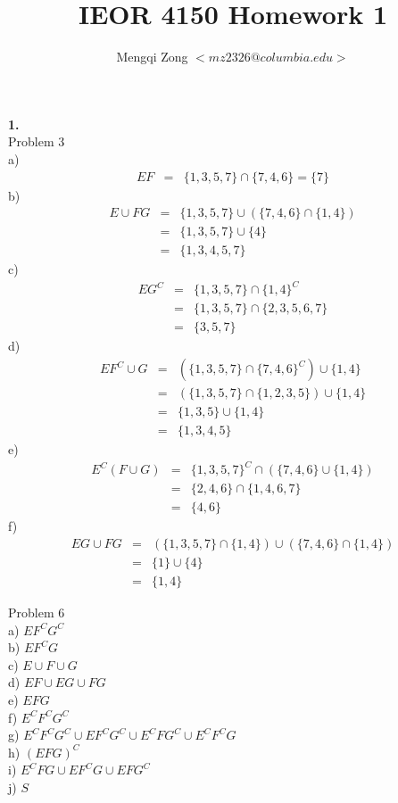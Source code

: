 \documentclass[12pt]{article}
\title{IEOR 4150 Homework 1}
\author{Mengqi Zong $<mz2326@columbia.edu>$}
\begin{document}
\maketitle

\setlength{\parindent}{0in}

{\bf 1.} \\

Problem 3 \\
a)
\begin{eqnarray*}
EF
&=& \{ 1,3,5,7 \} \cap \{ 7, 4, 6 \} = \{ 7 \}
\end{eqnarray*}
b)
\begin{eqnarray*}
E \cup FG
&=& \{ 1, 3, 5, 7 \} \cup (\{ 7, 4, 6 \} \cap \{ 1,4 \}) \\
&=& \{ 1, 3, 5, 7 \} \cup \{ 4 \} \\
&=& \{ 1, 3, 4, 5, 7 \}
\end{eqnarray*}
c)
\begin{eqnarray*}
EG^C
&=& \{ 1, 3, 5, 7 \} \cap \{ 1, 4 \}^C \\
&=& \{ 1, 3, 5, 7 \} \cap \{ 2, 3, 5, 6, 7 \} \\
&=& \{ 3, 5, 7 \}
\end{eqnarray*}
d)
\begin{eqnarray*}
EF^C \cup G
&=& (\{ 1, 3, 5, 7 \} \cap \{ 7, 4, 6\}^C) \cup \{ 1, 4 \} \\
&=& (\{ 1, 3, 5, 7 \} \cap \{ 1, 2, 3, 5 \}) \cup \{ 1, 4 \} \\
&=& \{ 1, 3, 5 \} \cup \{ 1, 4 \} \\
&=& \{ 1, 3, 4, 5 \}
\end{eqnarray*}
e)
\begin{eqnarray*}
E^C(F \cup G)
&=& \{ 1, 3, 5, 7 \}^C \cap (\{ 7, 4, 6 \} \cup \{ 1, 4 \}) \\
&=& \{ 2, 4, 6 \} \cap \{ 1, 4, 6, 7 \} \\
&=& \{ 4, 6 \}
\end{eqnarray*}
f)
\begin{eqnarray*}
EG \cup FG
&=& (\{ 1, 3, 5, 7\} \cap \{ 1, 4 \}) \cup (\{ 7, 4, 6\} \cap \{ 1, 4 \}) \\
&=& \{ 1 \} \cup \{ 4 \} \\
&=& \{ 1, 4\}
\end{eqnarray*}

Problem 6\\

a) $EF^CG^C$ \\
b) $EF^CG$ \\
c) $E \cup F \cup G$ \\
d) $EF \cup EG \cup FG$ \\
e) $EFG$ \\
f) $E^CF^CG^C$ \\
g) $E^CF^CG^C \cup EF^CG^C \cup E^CFG^C \cup E^CF^CG$ \\
h) $(EFG)^C$ \\
i) $E^CFG \cup EF^CG \cup EFG^C$ \\
j) $S$ \\
\end{document}
